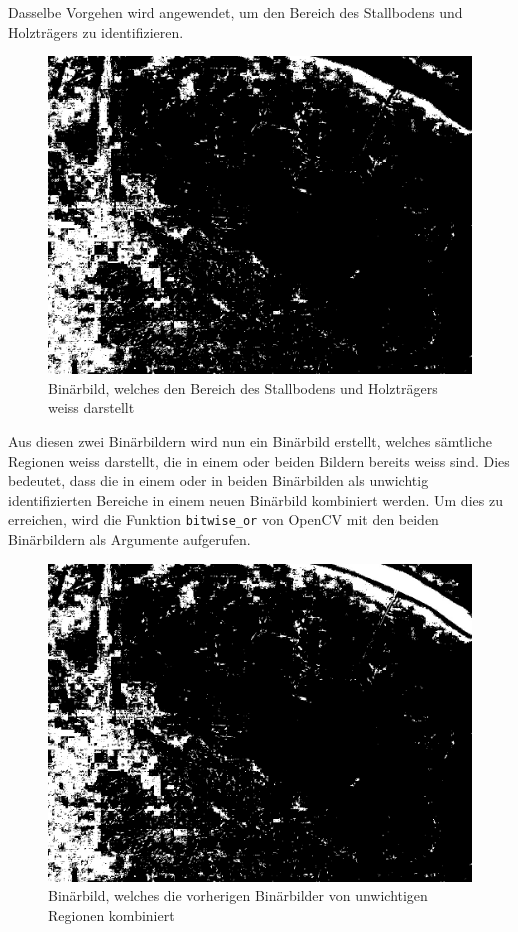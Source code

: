 Dasselbe Vorgehen wird angewendet, um den Bereich des Stallbodens und Holzträgers zu identifizieren.

\begin{figure}[H]
	\center
	\includegraphics[scale=0.43]{Grafiken/entwicklung/4binBildHolz.jpg}
	\caption{Binärbild, welches den Bereich des Stallbodens und Holzträgers weiss darstellt} 
	\label{fig: Binärbild, welches den Bereich des Stallbodens und Holzträgers weiss darstellt}
\end{figure}

Aus diesen zwei Binärbildern wird nun ein Binärbild erstellt, welches sämtliche Regionen weiss darstellt, die in einem oder beiden Bildern bereits weiss sind. Dies bedeutet, dass die in einem oder in beiden Binärbilden als unwichtig identifizierten Bereiche in einem neuen Binärbild kombiniert werden. Um dies zu erreichen, wird die Funktion \texttt{bitwise_or} von OpenCV mit den beiden Binärbildern als Argumente aufgerufen. 

\begin{figure}[H]
	\center
	\includegraphics[scale=0.43]{Grafiken/entwicklung/5binLampeUndHolz.jpg}
	\caption{Binärbild, welches die vorherigen Binärbilder von unwichtigen Regionen kombiniert} 
	\label{fig: Binärbild, die vorherigen Binärbilder kombiniert}
\end{figure}

